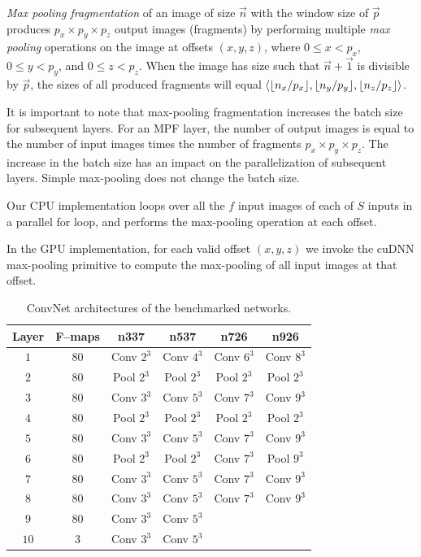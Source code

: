 \documentclass[conference]{./IEEEtran}
\DeclarePairedDelimiter{\floor}{\lfloor}{\rfloor}
\DeclarePairedDelimiter{\angled}{\langle}{\rangle}
\begin{document}
  \emph{Max pooling fragmentation} of an image of size $\vec{n}$ with the
  window size of $\vec{p}$ produces $p_x \times p_y \times p_z$ output
  images (fragments) by performing multiple \emph{max pooling}
  operations on the image at offsets $(x,y,z)$, where $0 \le x < p_x$,
  $0 \le y < p_y$, and $0 \le z < p_z$.  When the image has size such
  that $\vec{n} + \vec{1}$ is divisible by $\vec{p}$, the sizes of all
  produced fragments will equal
  $\angled{\floor{n_x/p_x},\floor{n_y/p_y},\floor{n_z/p_z}}$.

  It is important to note that max-pooling fragmentation increases the
  batch size for subsequent layers.  For an MPF layer, the number of
  output images is equal to the number of input images times the
  number of fragments $p_x \times p_y \times p_z$.  The increase in
  the batch size has an impact on the parallelization of subsequent
  layers.  Simple max-pooling does not change the batch size.

  Our CPU implementation loops over all the $f$ input images of each
  of $S$ inputs in a parallel for loop, and performs the max-pooling
  operation at each offset.

  In the GPU implementation, for each valid offset $(x,y,z)$ we invoke
  the cuDNN max-pooling primitive to compute the max-pooling of all
  input images at that offset.

  \begin{table}
    {\footnotesize
    \centering
    \begin{tabular}{cccccc}
      \toprule
      Layer & F--maps & n337    & n537  &  n726  &  n926 \\
      \midrule
      $1$ & 80 &  Conv $2^3$  & Conv $4^3$  & Conv $6^3$  & Conv $8^3$ \\
      $2$ & 80 &  Pool $2^3$  & Pool $2^3$  & Pool $2^3$  & Pool $2^3$ \\
      $3$ & 80 &  Conv $3^3$  & Conv $5^3$  & Conv $7^3$  & Conv $9^3$ \\
      $4$ & 80 &  Pool $2^3$  & Pool $2^3$  & Pool $2^3$  & Pool $2^3$ \\
      $5$ & 80 &  Conv $3^3$  & Conv $5^3$  & Conv $7^3$  & Conv $9^3$ \\
      $6$ & 80 &  Pool $2^3$  & Pool $2^3$  & Conv $7^3$  & Pool $9^3$ \\
      $7$ & 80 &  Conv $3^3$  & Conv $5^3$  & Conv $7^3$  & Conv $9^3$ \\
      $8$ & 80 &  Conv $3^3$  & Conv $5^3$  & Conv $7^3$  & Conv $9^3$ \\
      $9$ & 80 & Conv $3^3$  & Conv $5^3$  & & \\
      $10$ & 3 & Conv $3^3$  & Conv $5^3$  & & \\
      \bottomrule
    \end{tabular}
    \caption{ConvNet architectures of the benchmarked networks.}
    \label{table:benchmarked_networks}
    }
  \end{table}
\end{document}
